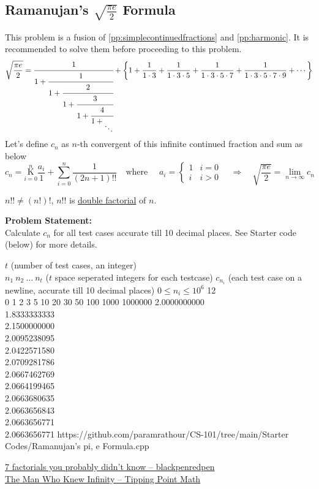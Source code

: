 \documentclass[../../Problems]{subfiles}
\begin{document}
\subsection{Ramanujan's $\sqrt{\frac{\pi e}{2}}$ Formula}{\label{pp:ramanujanpieformula}}
This problem is a fusion of \ref{pp:simplecontinuedfractions} and \ref{pp:harmonic}. It is recommended to solve them before proceeding to this problem.
\begin{equation}
 \sqrt{\frac{\pi e}{2}}=\cfrac{1}{1+{\cfrac {1}{1+{\cfrac {2}{1+{\cfrac {3}{1+{{\cfrac{4}{1+{_{\ddots }}} }}}}}}}}} + \left\{1 + \frac{1}{1\cdot3}+\frac{1}{1\cdot3\cdot5}+\frac{1}{1\cdot3\cdot5\cdot7}+\frac{1}{1\cdot3\cdot5\cdot7\cdot9}+\cdots\right\}
\end{equation}
Let's define $c_n$ as $n$-th convergent of this infinite continued fraction and sum as below
\begin{equation*}
c_n={\underset {i=0}{\overset {n }{\mathrm {K} }}}{\frac {a_i}{1}} + \sum_{i = 0}^n \frac{1}{(2n+1)!!} \quad\text{where }\quad a_i = \begin{cases} 
      1 & i = 0 \\
      i & i > 0
   \end{cases}\quad\Rightarrow\quad  \sqrt{\frac{\pi e}{2}} = \lim_{n\rightarrow\infty}c_n
\end{equation*}
\begin{note}
$n!! \neq (n!)!$, $n!!$ is \href{https://en.wikipedia.org/wiki/Double_factorial}{double factorial} of $n$.
\end{note}
\textbf{Problem Statement:}\\
Calculate $c_n$ for all test cases accurate till 10 decimal places. See Starter code (below) for more details.
\begin{testcases}
	{$t$ \hfill(number of test cases, an integer)\\$n_1\ n_2\ \ldots\ n_t$ \hfill($t$ space seperated integers for each testcase)}
	{$c_{n_i}$ \hfill(each test case on a newline, accurate till 10 decimal places)}
	{$0 \leq n_i \leq 10^{6}$}
	{12\\0 1 2 3 5 10 20 30 50 100 1000 1000000}
	{2.0000000000\\1.8333333333\\2.1500000000\\2.0095238095\\2.0422571580\\2.0709281786\\2.0667462769\\2.0664199465\\2.0663680635\\2.0663656843\\2.0663656771\\2.0663656771}
	{https://github.com/paramrathour/CS-101/tree/main/Starter Codes/Ramanujan's pi, e Formula.cpp}
\end{testcases}
\begin{funvideo}
\href{https://youtu.be/7eboFOkRHr4}{7 factorials you probably didn't know -- blackpenredpen}
\\\href{https://youtu.be/P0idBBhGNgU}{The Man Who Knew Infinity -- Tipping Point Math}
\end{funvideo}
\end{document}
